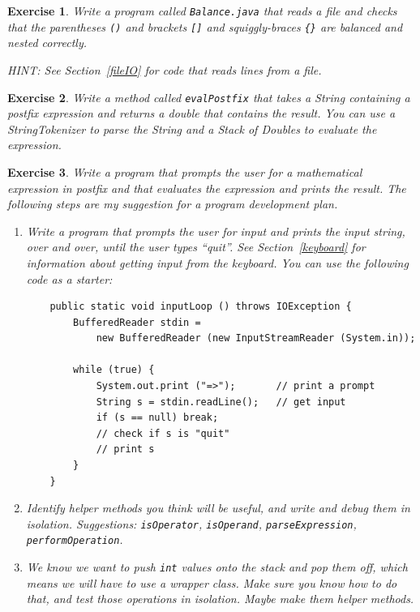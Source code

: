 \documentclass[12pt]{book}
\theoremstyle{exercise}
\newtheorem{exercise}{Exercise}[chapter]
\begin{document}
\begin{exercise}
Write a program called {\tt Balance.java} that reads a file
and checks that the parentheses {\tt ()} and brackets {\tt []}
and squiggly-braces {\tt \{\}} are balanced and nested correctly.

HINT: See Section~\ref{fileIO} for code that reads lines
from a file.
\end{exercise}


\begin{exercise}
Write a method called {\tt evalPostfix} that takes a String containing
a postfix expression and returns a double that contains the result.
You can use a StringTokenizer to parse the String and a Stack of
Doubles to evaluate the expression.
\end{exercise}

\begin{exercise}
Write a program that prompts the user for a mathematical
expression in postfix and that evaluates the expression and
prints the result.
The following steps are my suggestion for a program development
plan.

\begin {enumerate}

\item Write a program that prompts the user for input and prints the
input string, over and over, until the user types ``quit''.  See
Section~\ref{keyboard} for information about getting input from the
keyboard.  You can use the following code as a starter:

\begin{verbatim}
    public static void inputLoop () throws IOException {
        BufferedReader stdin =
            new BufferedReader (new InputStreamReader (System.in));
	
        while (true) {
            System.out.print ("=>");       // print a prompt
            String s = stdin.readLine();   // get input
            if (s == null) break;
            // check if s is "quit"
            // print s
        }
    }
\end{verbatim}

\item Identify helper methods you think will be useful, and
write and debug them in isolation.  Suggestions: {\tt isOperator},
{\tt isOperand}, {\tt parseExpression}, {\tt performOperation}.

\item We know we want to push {\tt int} values onto the stack
and pop them off, which means we will have to use a wrapper class.
Make sure you know how to do that, and test those operations in
isolation.  Maybe make them helper methods.


\end{enumerate}
\end{exercise}
\end{document}
